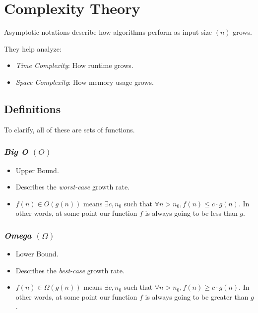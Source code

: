 \chapter{Complexity Theory}

Asymptotic notations describe how algorithms perform as input size \((n)\) grows.

They help analyze:

\begin{itemize}
  
    \item \emph{Time Complexity}: How runtime grows.
  
    \item \emph{Space Complexity}: How memory usage grows.

\end{itemize}

\section{Definitions}

To clarify, all of these are sets of functions.

\subsection{\emph{Big O} \texorpdfstring{\((O)\)}{}} 
    
\begin{itemize}
    
    \item Upper Bound.
    
    \item Describes the \emph{worst-case} growth rate.
    
    \item \(f(n) \in O(g(n))\) means \(\exists c, n_0\) such that \(\forall n > n_0, f(n) \leq c \cdot g(n)\). 
          In other words, at some point our function \(f\) is always going to be less than \(g\).

\end{itemize}

\subsection{\emph{Omega} \texorpdfstring{\((\Omega)\)}{}} 
    
\begin{itemize}

    \item Lower Bound.

    \item Describes the \emph{best-case} growth rate.

    \item \(f(n) \in \Omega(g(n))\) means \(\exists c, n_0\) such that \(\forall n > n_0, f(n) \geq c \cdot g(n)\). 
          In other words, at some point our function \(f\) is always going to be greater than \(g\).

\end{itemize}

